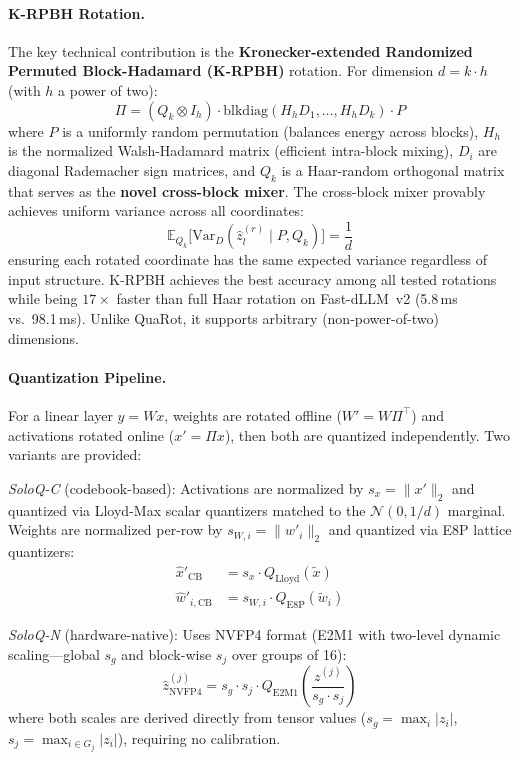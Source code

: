 \documentclass[11pt,a4paper]{article}
\begin{document}
\paragraph{K-RPBH Rotation.}
The key technical contribution is the \textbf{Kronecker-extended Randomized Permuted Block-Hadamard (K-RPBH)} rotation. For dimension $d = k \cdot h$ (with $h$ a power of two):
\begin{equation}
\Pi = (Q_k \otimes I_h) \cdot \text{blkdiag}(H_h D_1, \ldots, H_h D_k) \cdot P
\end{equation}
where $P$ is a uniformly random permutation (balances energy across blocks), $H_h$ is the normalized Walsh-Hadamard matrix (efficient intra-block mixing), $D_i$ are diagonal Rademacher sign matrices, and $Q_k$ is a Haar-random orthogonal matrix that serves as the \textbf{novel cross-block mixer}. The cross-block mixer provably achieves uniform variance across all coordinates:
\begin{equation}
\mathbb{E}_{Q_k}\bigl[\text{Var}_D(\hat{z}_l^{(r)} \mid P, Q_k)\bigr] = \frac{1}{d}
\end{equation}
ensuring each rotated coordinate has the same expected variance regardless of input structure. K-RPBH achieves the best accuracy among all tested rotations while being $17\times$ faster than full Haar rotation on Fast-dLLM~v2 (5.8\,ms vs.\ 98.1\,ms). Unlike QuaRot, it supports arbitrary (non-power-of-two) dimensions.

\paragraph{Quantization Pipeline.}
For a linear layer $y = Wx$, weights are rotated offline ($W' = W\Pi^\top$) and activations rotated online ($x' = \Pi x$), then both are quantized independently. Two variants are provided:

\emph{SoloQ-C} (codebook-based): Activations are normalized by $s_x = \|x'\|_2$ and quantized via Lloyd-Max scalar quantizers matched to the $\mathcal{N}(0,1/d)$ marginal. Weights are normalized per-row by $s_{W,i} = \|w'_i\|_2$ and quantized via E8P lattice quantizers:
\begin{align}
\hat{x}'_{\text{CB}} &= s_x \cdot Q_{\text{Lloyd}}(\tilde{x}) \\
\hat{w}'_{i,\text{CB}} &= s_{W,i} \cdot Q_{\text{E8P}}(\tilde{w}_i)
\end{align}

\emph{SoloQ-N} (hardware-native): Uses NVFP4 format (E2M1 with two-level dynamic scaling---global $s_g$ and block-wise $s_j$ over groups of 16):
\begin{equation}
\hat{z}^{(j)}_{\text{NVFP4}} = s_g \cdot s_j \cdot Q_{\text{E2M1}}\!\left(\frac{z^{(j)}}{s_g \cdot s_j}\right)
\end{equation}
where both scales are derived directly from tensor values ($s_g = \max_i |z_i|$, $s_j = \max_{i \in G_j} |z_i|$), requiring no calibration.
\end{document}
